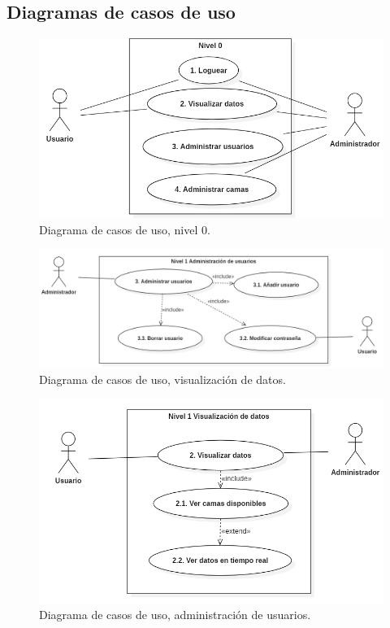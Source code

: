 \subsection{Diagramas de casos de uso}

\begin{figure}[H]
	\centering
	\includegraphics[width=1\textwidth]{../img/cu-n0.png}
	\caption{Diagrama de casos de uso, nivel 0.}
	\label{fig:cu-n0}
\end{figure}

\begin{figure}[H]
	\centering
	\includegraphics[width=1\textwidth]{../img/cu-n1-2.png}
	\caption{Diagrama de casos de uso, visualización de datos.}
	\label{fig:cu-n1.2}
\end{figure}

\begin{figure}[H]
	\centering
	\includegraphics[width=1\textwidth]{../img/cu-n1-3.png}
	\caption{Diagrama de casos de uso, administración de usuarios.}
	\label{fig:cu-n1.3}
\end{figure}

